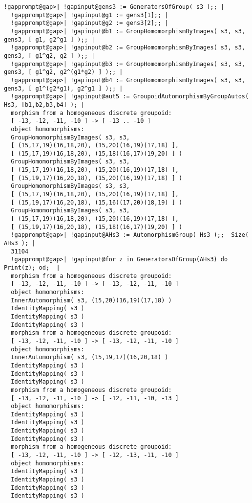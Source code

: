 \documentclass[a4paper,11pt]{report}
\begin{document}
{{{\begin{Verbatim}[commandchars=!@|,fontsize=\small,frame=single,label=Example]
  !gapprompt@gap>| !gapinput@gens3 := GeneratorsOfGroup( s3 );; |
  !gapprompt@gap>| !gapinput@g1 := gens3[1];; |
  !gapprompt@gap>| !gapinput@g2 := gens3[2];; |
  !gapprompt@gap>| !gapinput@b1 := GroupHomomorphismByImages( s3, s3, gens3, [ g1, g2^g1 ] );; |
  !gapprompt@gap>| !gapinput@b2 := GroupHomomorphismByImages( s3, s3, gens3, [ g1^g2, g2 ] );; |
  !gapprompt@gap>| !gapinput@b3 := GroupHomomorphismByImages( s3, s3, gens3, [ g1^g2, g2^(g1*g2) ] );; |
  !gapprompt@gap>| !gapinput@b4 := GroupHomomorphismByImages( s3, s3, gens3, [ g1^(g2*g1), g2^g1 ] );; |
  !gapprompt@gap>| !gapinput@aut5 := GroupoidAutomorphismByGroupAutos( Hs3, [b1,b2,b3,b4] ); |
  morphism from a homogeneous discrete groupoid:
  [ -13, -12, -11, -10 ] -> [ -13 .. -10 ]
  object homomorphisms:
  GroupHomomorphismByImages( s3, s3, 
  [ (15,17,19)(16,18,20), (15,20)(16,19)(17,18) ], 
  [ (15,17,19)(16,18,20), (15,18)(16,17)(19,20) ] )
  GroupHomomorphismByImages( s3, s3, 
  [ (15,17,19)(16,18,20), (15,20)(16,19)(17,18) ], 
  [ (15,19,17)(16,20,18), (15,20)(16,19)(17,18) ] )
  GroupHomomorphismByImages( s3, s3, 
  [ (15,17,19)(16,18,20), (15,20)(16,19)(17,18) ], 
  [ (15,19,17)(16,20,18), (15,16)(17,20)(18,19) ] )
  GroupHomomorphismByImages( s3, s3, 
  [ (15,17,19)(16,18,20), (15,20)(16,19)(17,18) ], 
  [ (15,19,17)(16,20,18), (15,18)(16,17)(19,20) ] )
  !gapprompt@gap>| !gapinput@AHs3 := AutomorphismGroup( Hs3 );;  Size( AHs3 ); |
  31104
  !gapprompt@gap>| !gapinput@for z in GeneratorsOfGroup(AHs3) do Print(z); od;  |
  morphism from a homogeneous discrete groupoid:
  [ -13, -12, -11, -10 ] -> [ -13, -12, -11, -10 ]
  object homomorphisms:
  InnerAutomorphism( s3, (15,20)(16,19)(17,18) )
  IdentityMapping( s3 )
  IdentityMapping( s3 )
  IdentityMapping( s3 )
  morphism from a homogeneous discrete groupoid:
  [ -13, -12, -11, -10 ] -> [ -13, -12, -11, -10 ]
  object homomorphisms:
  InnerAutomorphism( s3, (15,19,17)(16,20,18) )
  IdentityMapping( s3 )
  IdentityMapping( s3 )
  IdentityMapping( s3 )
  morphism from a homogeneous discrete groupoid:
  [ -13, -12, -11, -10 ] -> [ -12, -11, -10, -13 ]
  object homomorphisms:
  IdentityMapping( s3 )
  IdentityMapping( s3 )
  IdentityMapping( s3 )
  IdentityMapping( s3 )
  morphism from a homogeneous discrete groupoid:
  [ -13, -12, -11, -10 ] -> [ -12, -13, -11, -10 ]
  object homomorphisms:
  IdentityMapping( s3 )
  IdentityMapping( s3 )
  IdentityMapping( s3 )
  IdentityMapping( s3 )
  
\end{Verbatim}
 

 }

 }

 }
\end{document}
